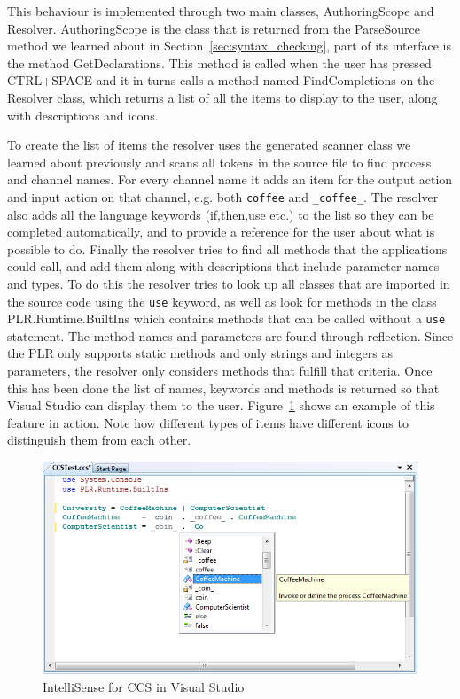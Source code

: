 	This behaviour is implemented through two main classes, 
	\textsf{AuthoringScope} and \textsf{Resolver}. \textsf{AuthoringScope} is 
	the class that is returned from the \textsf{ParseSource} method we learned 
	about in Section~\ref{sec:syntax_checking}, part of its interface is the 
	method \textsf{GetDeclarations}. This method is called when the user has 
	pressed CTRL+SPACE and it in turns calls a method named 
	\textsf{FindCompletions} on the \textsf{Resolver} class, which returns a 
	list of all the items to display to the user, along with descriptions and 
	icons. 
	
	To create the list of items the resolver uses the generated scanner class we 
	learned about previously and scans all tokens in the source file to find 
	process and channel names. For every channel name it adds an item for the 
	output action and input action on that channel, e.g. both \texttt{coffee} 
	and \texttt{\_coffee\_}. The resolver also adds all the language keywords 
	(if,then,use etc.) to the list so they can be completed automatically, and 
	to provide a reference for the user about what is possible to do. Finally 
	the resolver tries to find all methods that the applications could call, and 
	add them along with descriptions that include parameter names and types. To 
	do this the resolver tries to look up all classes that are imported in the 
	source code using the \texttt{use} keyword, as well as look for methods in 
	the class \textsf{PLR.Runtime.BuiltIns} which contains methods that can be 
	called without a \texttt{use} statement. The method names and parameters are 
	found through reflection. Since the PLR only supports static methods and 
	only strings and integers as parameters, the resolver only considers methods 
	that fulfill that criteria. Once this has been done the list of names, 
	keywords and methods is returned so that Visual Studio can display them to 
	the user. Figure~\ref{fig:intellisense} shows an example of this feature in 
	action. Note how different types of items have different icons to 
	distinguish them from each other.

	\begin{figure}[h!]
		\centering
		\includegraphics[scale=0.5]{intellisense.png}
		\caption{IntelliSense for CCS in Visual Studio}
		\label{fig:intellisense}
	\end{figure}
	
